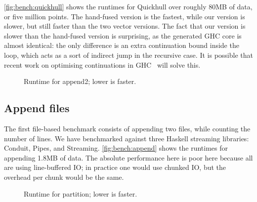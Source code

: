 \autoref{fig:bench:quickhull} shows the runtimes for Quickhull over roughly 80MB of data, or five million points.
The hand-fused version is the fastest, while our version is slower, but still faster than the two vector versions.
The fact that our version is slower than the hand-fused version is surprising, as the generated GHC core is almost identical: the only difference is an extra continuation bound inside the loop, which acts as a sort of indirect jump in the recursive case.
It is possible that recent work on optimising continuations in GHC~\cite{downen2016sequent} will solve this.

\begin{figure}
\caption{Runtime for append2; lower is faster.}
\label{fig:bench:append}
\end{figure}

\subsection{Append files}
The first file-based benchmark consists of appending two files, while counting the number of lines.
We have benchmarked against three Haskell streaming libraries: Conduit, Pipes, and Streaming.
\autoref{fig:bench:append} shows the runtimes for appending 1.8MB of data.
The absolute performance here is poor here because all are using line-buffered IO; in practice one would use chunked IO, but the overhead per chunk would be the same.


\begin{figure}
\caption{Runtime for partition; lower is faster.}
\label{fig:bench:part}
\end{figure}

